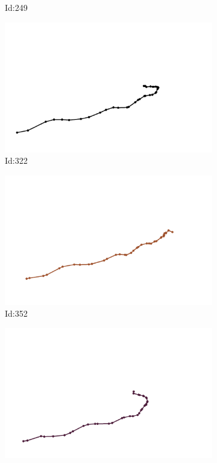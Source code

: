 \documentclass[12pt,twoside]{report}
\begin{document}
\begin{figure}
\begin{subfigure}[b]{0.20\textwidth}
\caption{Id:249}
\end{subfigure}
\begin{subfigure}[b]{0.20\textwidth}
\centering
\includegraphics[width=\textwidth]{../trajectories/322.png}
\caption{Id:322}
\end{subfigure}
\begin{subfigure}[b]{0.20\textwidth}
\centering
\includegraphics[width=\textwidth]{../trajectories/352.png}
\caption{Id:352}
\end{subfigure}
\begin{subfigure}[b]{0.20\textwidth}
\centering
\includegraphics[width=\textwidth]{../trajectories/386.png}

\end{subfigure}
\end{figure}
\end{document}
